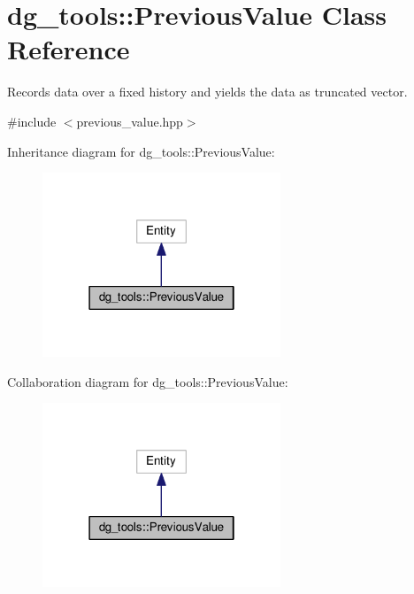 \hypertarget{classdg__tools_1_1PreviousValue}{}\section{dg\+\_\+tools\+:\+:Previous\+Value Class Reference}
\label{classdg__tools_1_1PreviousValue}


Records data over a fixed history and yields the data as truncated vector.  




{\ttfamily \#include $<$previous\+\_\+value.\+hpp$>$}



Inheritance diagram for dg\+\_\+tools\+:\+:Previous\+Value\+:
\nopagebreak
\begin{figure}[H]
\begin{center}
\leavevmode
\includegraphics[width=202pt]{classdg__tools_1_1PreviousValue__inherit__graph}
\end{center}
\end{figure}


Collaboration diagram for dg\+\_\+tools\+:\+:Previous\+Value\+:
\nopagebreak
\begin{figure}[H]
\begin{center}
\leavevmode
\includegraphics[width=202pt]{classdg__tools_1_1PreviousValue__coll__graph}
\end{center}
\end{figure}
